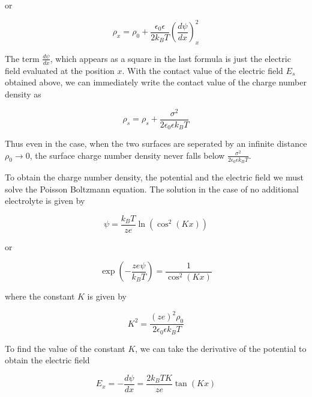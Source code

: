 \documentclass[letterpaper,10pt,english]{sphinxmanual}
\begin{document}
\sphinxAtStartPar
or

\sphinxAtStartPar
\begin{equation}
\rho_x=\rho_0 + \frac{\epsilon_0 \epsilon}{2k_B T} \left (\frac{d\psi}{dx} \right )^2_x
\end{equation}

\sphinxAtStartPar
The term \(\frac{d\psi}{dx}\), which appears as a square in the last formula is just the electric field evaluated at the position \(x\). With the contact value of the electric field \(E_s\) obtained above, we can immediately write the contact value of the charge number density as

\sphinxAtStartPar
\begin{equation}
\rho_s=\rho_s+\frac{\sigma^2}{2\epsilon_0 \epsilon k_B T}
\end{equation}

\sphinxAtStartPar
Thus even in the case, when the two surfaces are seperated by an infinite distance \(\rho_0\rightarrow 0\), the surface charge number density never falls below \(\frac{\sigma^2}{2\epsilon_0 \epsilon k_B T}\).

\sphinxAtStartPar
To obtain the charge number density, the potential and the electric field we must solve the Poisson Boltzmann equation. The solution in the case of no additional electrolyte is given by

\sphinxAtStartPar
\begin{equation}
\psi=\frac{k_B T }{z e}\ln(\cos^{2}(Kx))
\end{equation}

\sphinxAtStartPar
or

\sphinxAtStartPar
\begin{equation}
\exp\left ( -\frac{z e \psi}{k_B T}\right )=\frac{1} { \cos ^{2} (K x)}
\end{equation}

\sphinxAtStartPar
where the constant \(K\) is given by

\sphinxAtStartPar
\begin{equation}
K^{2}=\frac{(z e)^{2} \rho_{0} }{ 2 \epsilon_{0} \epsilon k_B T}
\end{equation}

\sphinxAtStartPar
To find the value of the constant \(K\), we can take the derivative of the potential to obtain the electric field

\sphinxAtStartPar
\begin{equation}
E_{x}=-\frac{d\psi}{dx}= \frac{2k_B T K}{z e}\tan(K x)
\end{equation}
\end{document}
